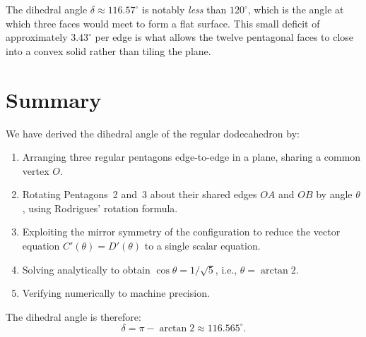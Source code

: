 \documentclass[11pt,a4paper]{article}
\theoremstyle{definition}
\begin{document}
The dihedral angle $\delta \approx 116.57^\circ$ is notably \emph{less} than
$120^\circ$, which is the angle at which three faces would meet to form a flat
surface. This small deficit of approximately $3.43^\circ$ per edge is what allows
the twelve pentagonal faces to close into a convex solid rather than tiling the plane.

\section{Summary}

We have derived the dihedral angle of the regular dodecahedron by:
\begin{enumerate}[nosep]
  \item Arranging three regular pentagons edge-to-edge in a plane, sharing a common
        vertex $O$.
  \item Rotating Pentagons~2 and~3 about their shared edges $OA$ and $OB$ by angle
        $\theta$, using Rodrigues' rotation formula.
  \item Exploiting the mirror symmetry of the configuration to reduce the vector
        equation $C'(\theta) = D'(\theta)$ to a single scalar equation.
  \item Solving analytically to obtain $\cos\theta = 1/\sqrt{5}$, i.e.,
        $\theta = \arctan 2$.
  \item Verifying numerically to machine precision.
\end{enumerate}

The dihedral angle is therefore:
\[
  \boxed{\delta = \pi - \arctan 2 \approx 116.565^\circ.}
\]
\end{document}
